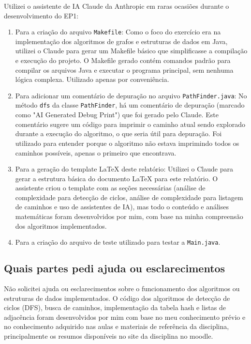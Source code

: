 \documentclass[12pt]{article}
\begin{document}
Utilizei o assistente de IA Claude da Anthropic em raras ocasiões durante o desenvolvimento do EP1:

\begin{enumerate}
    \item Para a criação do arquivo \texttt{Makefile}: Como o foco do exercício era na implementação dos algoritmos de grafos e estruturas de dados em Java, utilizei o Claude para gerar um Makefile básico que simplificasse a compilação e execução do projeto. O Makefile gerado contém comandos padrão para compilar os arquivos Java e executar o programa principal, sem nenhuma lógica complexa. Utilizado apenas por conveniência.
    
    \item Para adicionar um comentário de depuração no arquivo \texttt{PathFinder.java}: No método \texttt{dfs} da classe \texttt{PathFinder}, há um comentário de depuração (marcado como "AI Generated Debug Print") que foi gerado pelo Claude. Este comentário sugere um código para imprimir o caminho atual sendo explorado durante a execução do algoritmo, o que seria útil para depuração. Foi utilizado para entender porque o algoritmo não estava imprimindo todos os caminhos possíveis, apenas o primeiro que encontrava.

    \item Para a geração do template LaTeX deste relatório: Utilizei o Claude para gerar a estrutura básica do documento LaTeX para este relatório. O assistente criou o template com as seções necessárias (análise de complexidade para detecção de ciclos, análise de complexidade para listagem de caminhos e uso de assistentes de IA), mas todo o conteúdo e análises matemáticas foram desenvolvidos por mim, com base na minha compreensão dos algoritmos implementados.

    \item Para a criação do arquivo de teste utilizado para testar a \texttt{Main.java}. 
\end{enumerate}

\subsection{Quais partes pedi ajuda ou esclarecimentos}

Não solicitei ajuda ou esclarecimentos sobre o funcionamento dos algoritmos ou estruturas de dados implementados. O código dos algoritmos de detecção de ciclos (DFS), busca de caminhos, implementação da tabela hash e listas de adjacência foram desenvolvidos por mim com base no meu conhecimento prévio e no conhecimento adquirido nas aulas e materiais de referência da disciplina, principalmente os resumos disponíveis no site da disciplina no moodle.
\end{document}
